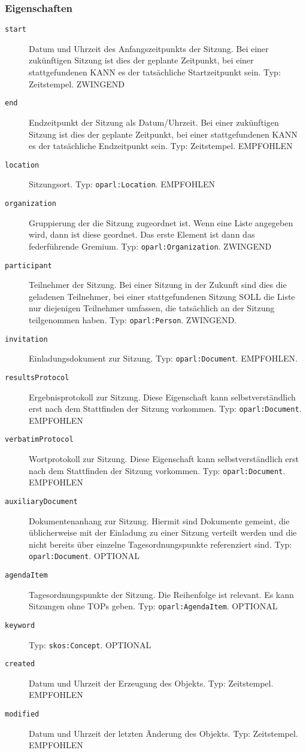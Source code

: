 \documentclass[,a4paper]{article}
\begin{document}
\subsubsection{Eigenschaften}\label{eigenschaften-4}

\begin{description}
\item[\texttt{start}]
Datum und Uhrzeit des Anfangszeitpunkts der Sitzung. Bei einer
zukünftigen Sitzung ist dies der geplante Zeitpunkt, bei einer
stattgefundenen KANN es der tatsächliche Startzeitpunkt sein. Typ:
Zeitstempel. ZWINGEND
\item[\texttt{end}]
Endzeitpunkt der Sitzung als Datum/Uhrzeit. Bei einer zukünftigen
Sitzung ist dies der geplante Zeitpunkt, bei einer stattgefundenen KANN
es der tatsächliche Endzeitpunkt sein. Typ: Zeitstempel. EMPFOHLEN
\item[\texttt{location}]
Sitzungsort. Typ: \texttt{oparl:Location}. EMPFOHLEN
\item[\texttt{organization}]
Gruppierung der die Sitzung zugeordnet ist. Wenn eine Liste angegeben
wird, dann ist diese geordnet. Das erste Element ist dann das
federführende Gremium. Typ: \texttt{oparl:Organization}. ZWINGEND
\item[\texttt{participant}]
Teilnehmer der Sitzung. Bei einer Sitzung in der Zukunft sind dies die
geladenen Teilnehmer, bei einer stattgefundenen Sitzung SOLL die Liste
nur diejenigen Teilnehmer umfassen, die tatsächlich an der Sitzung
teilgenommen haben. Typ: \texttt{oparl:Person}. ZWINGEND.
\item[\texttt{invitation}]
Einladungsdokument zur Sitzung. Typ: \texttt{oparl:Document}. EMPFOHLEN.
\item[\texttt{resultsProtocol}]
Ergebnisprotokoll zur Sitzung. Diese Eigenschaft kann selbstverständlich
erst nach dem Stattfinden der Sitzung vorkommen. Typ:
\texttt{oparl:Document}. EMPFOHLEN
\item[\texttt{verbatimProtocol}]
Wortprotokoll zur Sitzung. Diese Eigenschaft kann selbstverständlich
erst nach dem Stattfinden der Sitzung vorkommen. Typ:
\texttt{oparl:Document}. EMPFOHLEN
\item[\texttt{auxiliaryDocument}]
Dokumentenanhang zur Sitzung. Hiermit sind Dokumente gemeint, die
üblicherweise mit der Einladung zu einer Sitzung verteilt werden und die
nicht bereits über einzelne Tagesordnungspunkte referenziert sind. Typ:
\texttt{oparl:Document}. OPTIONAL
\item[\texttt{agendaItem}]
Tagesordnungspunkte der Sitzung. Die Reihenfolge ist relevant. Es kann
Sitzungen ohne TOPs geben. Typ: \texttt{oparl:AgendaItem}. OPTIONAL
\item[\texttt{keyword}]
Typ: \texttt{skos:Concept}. OPTIONAL
\item[\texttt{created}]
Datum und Uhrzeit der Erzeugung des Objekts. Typ: Zeitstempel. EMPFOHLEN
\item[\texttt{modified}]
Datum und Uhrzeit der letzten Änderung des Objekts. Typ: Zeitstempel.
EMPFOHLEN
\end{description}
\end{document}
